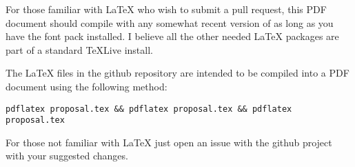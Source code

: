 For those familiar with \LaTeX{} who wish to submit a pull request, this PDF document
should compile with any somewhat recent version of
 as long as you have the
 font pack installed. I believe
all the other needed \LaTeX{} packages are part of a standard \TeX{}Live install.

The \LaTeX{} files in the github repository are intended to be compiled into a PDF document
using the following method:

\begin{verbatim}
pdflatex proposal.tex && pdflatex proposal.tex && pdflatex proposal.tex
\end{verbatim}

For those not familiar with \LaTeX{} just open an issue with the github project with your
suggested changes.


